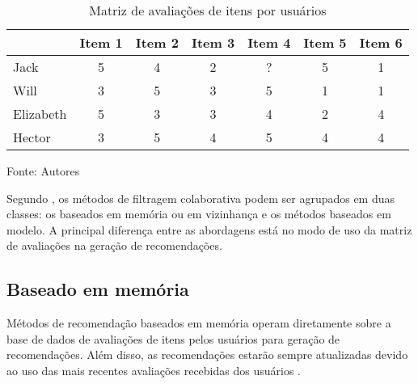     \begin{table}[htb]
        
        \caption{Matriz de avaliações de itens por usuários}
        \label{tab:matriz-av-item-user}
        \begin{tabular}{@{}lcccccc@{}}
        \toprule
                  & Item 1 & Item 2 & Item 3 & Item 4 & Item 5 & Item 6 \\ \midrule
        Jack      & 5      & 4      & 2      & ?      & 5      & 1      \\
        Will      & 3      & 5      & 3      & 5      & 1      & 1      \\
        Elizabeth & 5      & 3      & 3      & 4      & 2      & 4      \\
        Hector    & 3      & 5      & 4      & 5      & 4      & 4      \\ \bottomrule
        \end{tabular}
        
        \footnotesize{Fonte: Autores}
    \end{table}
    
    Segundo , os métodos de filtragem colaborativa podem ser agrupados em duas classes: os baseados em memória ou em vizinhança e os métodos baseados em modelo. A principal diferença entre as abordagens está no modo de uso da matriz de avaliações na geração de recomendações. 
    
    
        
    \subsection{Baseado em memória}
        
        Métodos de recomendação baseados em memória operam diretamente sobre a base de dados de avaliações de itens pelos usuários para geração de recomendações. Além disso, as recomendações estarão sempre atualizadas devido ao uso das mais recentes avaliações recebidas dos usuários \cite{Bobadilla_2013}. 
        
        
